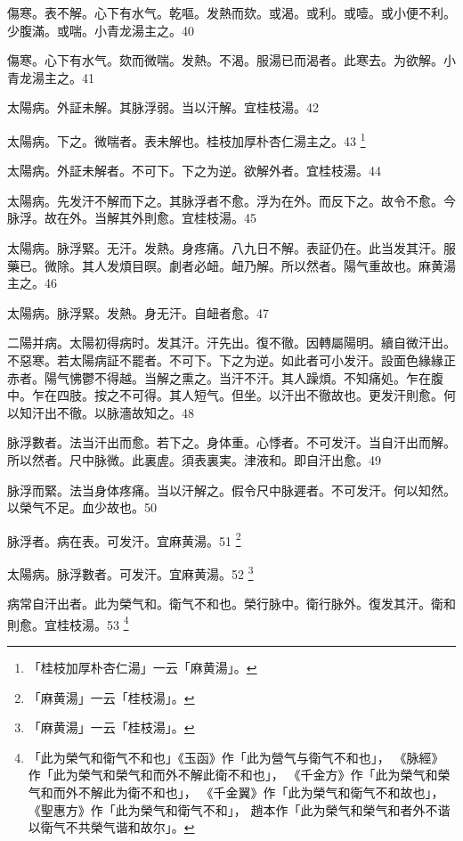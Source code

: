 傷寒。表不解。心下有水气。乾嘔。发熱而欬。或渴。或利。或噎。或小便不利。少腹滿。或喘。小青龙湯主之。40

傷寒。心下有水气。欬而微喘。发熱。不渴。服湯已而渴者。此寒去。为欲解。小青龙湯主之。41

太陽病。外証未解。其脉浮弱。当以汗解。宜桂枝湯。42

太陽病。下之。微喘者。表未解也。桂枝{\khaaitp 加厚朴杏仁}湯主之。43
	\footnote{
		「桂枝加厚朴杏仁湯」一云「麻黄湯」。
	}

太陽病。外証未解者。不可下。下之为逆。欲解外者。宜桂枝湯。44

太陽病。先发汗不解而下之。其脉浮者不愈。浮为在外。而反下之。故令不愈。今脉浮。故在外。当解其外則愈。宜桂枝湯。45

太陽病。脉浮緊。无汗。发熱。身疼痛。八九日不解。表証仍在。此当发其汗。服藥已。微除。其人发煩目暝。劇者必衄。衄乃解。所以然者。陽气重故也。麻黄湯主之。46

太陽病。脉浮緊。发熱。身无汗。自衄者愈。47

二陽并病。太陽初得病时。发其汗。汗先出{\khaaitp 。復}不徹。因轉屬陽明。續自微汗出。不惡寒。若太陽病証不罷者。不可下。下之为逆。如此者可小发汗。設面色緣緣正赤者。陽气怫鬱不得越。当解之熏之。当汗不汗。其人躁煩。不知痛処。乍在腹中。乍在四肢。按之不可得。其人短气。但坐。以汗出不徹故也。更发汗則愈。何以知汗出不徹。以脉濇故知之。48

脉浮數者。法当汗出而愈。若下之。身体重。心悸者。不可发汗。当自汗出而解。所以然者。尺中脉微。此裏虗。須表裏実。津液和。即自汗出愈。49

脉浮而緊。法当身体疼痛。当以汗解之。假令尺中脉遲者。不可发汗。何以知然。以榮气不足。血少故也。50

脉浮者。病在表。可发汗。宜麻黄湯。51
	\footnote{
		「麻黄湯」一云「桂枝湯」。
	}

{\khaaitp 太陽病。}脉浮數者。可发汗。宜麻黄湯。52
	\footnote{
		「麻黄湯」一云「桂枝湯」。
	}

病常自汗出者。此为榮气和。衛气不和也。榮行脉中。衛行脉外。復发其汗。衛和則愈。宜桂枝湯。53
	\footnote{
		「此为榮气和衛气不和也」《玉函》作「此为營气与衛气不和也」，
		《脉經》作「此为榮气和榮气和而外不解此衛不和也」，
		《千金方》作「此为榮气和榮气和而外不解此为衛不和也」，
		《千金翼》作「此为榮气和衛气不和故也」，
		《聖惠方》作「此为榮气和衛气不和」，
		趙本作「此为榮气和榮气和者外不谐以衛气不共榮气谐和故尔」。
	}

